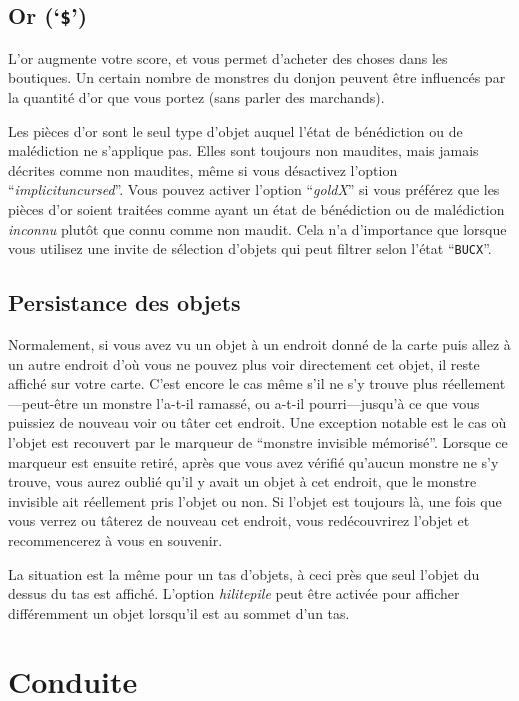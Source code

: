 \documentclass[titlepage]{article}
\begin{document}
\subsection*{Or (`\texttt{\$}')}

L'or augmente votre score, et vous permet d'acheter des choses dans les boutiques.
Un certain nombre
de monstres du donjon peuvent être influencés par la quantité d'or
que vous portez (sans parler des marchands).

Les pièces d'or sont le seul type d'objet auquel l'état de bénédiction ou de
malédiction ne s'applique pas.
Elles sont toujours non maudites, mais jamais décrites comme non maudites, même si
vous désactivez l'option ``\textit{implicit\textunderscore uncursed}''.
Vous pouvez activer l'option ``\textit{goldX}''
si vous préférez que les pièces d'or soient traitées comme ayant un état de
bénédiction ou de malédiction \textit{inconnu} plutôt que connu comme non maudit.
Cela n'a d'importance que lorsque vous utilisez une invite de sélection d'objets
qui peut filtrer selon l'état ``\texttt{BUCX}''.

\subsection*{Persistance des objets}

Normalement, si vous avez vu un objet à un endroit donné de la carte puis
allez à un autre endroit d'où vous ne pouvez plus voir directement cet objet,
il reste affiché sur votre carte.
C'est encore le cas même s'il ne s'y trouve plus
réellement---peut-être un monstre l'a-t-il ramassé, ou a-t-il pourri---jusqu'à
ce que vous puissiez de nouveau voir ou tâter cet endroit.
Une exception notable est le cas où l'objet est recouvert par le marqueur de
``monstre invisible mémorisé''.
Lorsque ce marqueur est ensuite retiré,
après que vous avez vérifié qu'aucun monstre ne s'y trouve, vous aurez oublié
qu'il y avait un objet à cet endroit, que le monstre invisible ait réellement
pris l'objet ou non.
Si l'objet est toujours là, une fois que vous verrez ou tâterez de nouveau cet
endroit, vous redécouvrirez l'objet et recommencerez à vous en souvenir.

La situation est la même pour un tas d'objets, à ceci près que seul
l'objet du dessus du tas est affiché.
L'option
\textit{hilite\textunderscore pile}
peut être activée pour afficher différemment un objet lorsqu'il est
au sommet d'un tas.

\section{Conduite}
\end{document}
